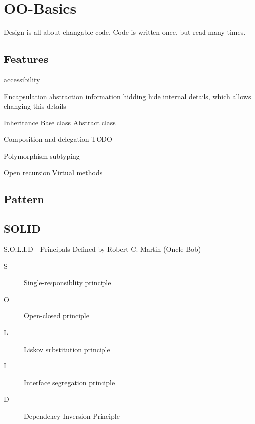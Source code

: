\documentclass{beamer}
\begin{document}
\section{OO-Basics}

\begin{frame}
Design is all about changable code.
Code is written once, but read many times.
\end{frame}

\subsection{Features}

\begin{frame}
accessibility
\end{frame}

\begin{frame}{Encapsulation}
abstraction
information hidding
hide internal details, which allows changing this details
\end{frame}

\begin{frame}{Inheritance}
Base class
Abstract class
\end{frame}

\begin{frame}{Composition and delegation}
TODO
\end{frame}

\begin{frame}{Polymorphism}
subtyping
\end{frame}

\begin{frame}{Open recursion}
Virtual methods




\end{frame}


\subsection{Pattern}



\subsection{SOLID}

\begin{frame}{S.O.L.I.D - Principals}
Defined by Robert C. Martin (Oncle Bob)


\begin{description}
\item [S] Single-responsiblity principle
\item [O] Open-closed principle
\item [L] Liskov substitution principle
\item [I] Interface segregation principle
\item [D] Dependency Inversion Principle
\end{description}
\end{frame}
\end{document}
